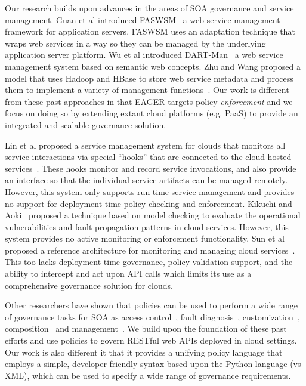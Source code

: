 Our research builds upon advances in the areas of SOA governance and
service management. 
Guan et al introduced FASWSM~\cite{1607141} a web service management
framework for application servers. FASWSM uses an adaptation technique that
wraps web services in a way so they can be managed by the underlying
application server platform. Wu et al introduced DART-Man~\cite{1504267} a web
service management system based on semantic web concepts.  Zhu and Wang
proposed a model that uses Hadoop and HBase to store web service metadata and
process them to implement a variety of management functions~\cite{5959326}.
Our work is different 
from these past approaches in that EAGER targets policy \textit{enforcement} 
and we focus on doing so by extending extant
cloud platforms (e.g. PaaS) to provide an integrated and scalable governance
solution.

Lin et al proposed a service management system for clouds that monitors all
service interactions via special ``hooks'' that are connected to the
cloud-hosted services~\cite{5616981}. These hooks monitor and record service
invocations, and also provide an interface so that the individual service
artifacts can be managed remotely. However, this system only supports run-time
service management and provides no support for deployment-time policy checking
and enforcement.  Kikuchi and Aoki~\cite{6525502} proposed a technique
based on model checking to evaluate the operational vulnerabilities and fault
propagation patterns in cloud services. However, this system provides no
active monitoring or enforcement functionality.
Sun et al proposed a reference architecture for monitoring and managing cloud
services~\cite{5579654}. This too lacks deployment-time governance, policy
validation support, and the ability to intercept and act upon API calls which
limits its use as a comprehensive governance solution for clouds.

Other researchers have shown that policies can be
used to perform a wide range of governance tasks for SOA as access
control~\cite{4279630,5713420}, fault diagnosis~\cite{6154236},
customization~\cite{4027138},
composition~\cite{1592403,Erradi:2006:PMS:1515984.1515990} and
management~\cite{Suleiman:2009:IUM:1564601.1564730,6481237,4028029}. We build
upon the foundation of these past efforts and use policies to govern
RESTful web APIs deployed in cloud settings. 
Our work is also different it that it provides a 
unifying policy language that employs a simple, developer-friendly syntax
based upon the Python language (vs XML), which can be
used to specify a wide range of governance requirements.


